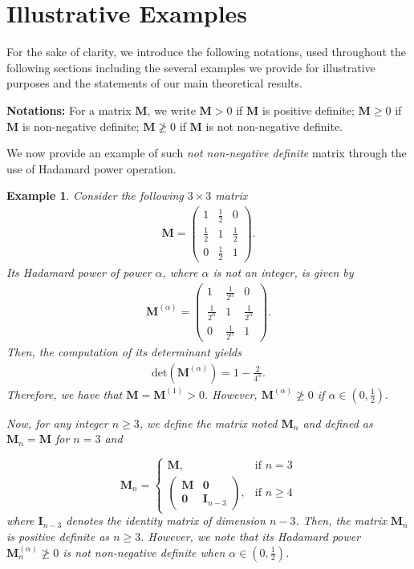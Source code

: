 \documentclass[conference,letterpaper]{IEEEtran}
\numberwithin{equation}{section}
\newcommand{\lbl}{\label}
\newcommand{\beaa}{\begin{eqnarray*}}
\newcommand{\eeaa}{\end{eqnarray*}}
\newtheorem{example}{{\sc Example}}[section]
\begin{document}
\section{Illustrative Examples}\lbl{sec:main}

For the sake of clarity, we introduce the following notations, used throughout the following sections including the several examples we provide for illustrative purposes and the statements of our main theoretical results.  

\medskip
\textbf{Notations: } For a matrix $\mathbf{M}$, we write $\mathbf{M}>0$ if $\mathbf{M}$ is positive definite; $\mathbf{M}\geq 0$ if $\mathbf{M}$ is non-negative definite; $\mathbf{M}\ngeqslant 0$ if $\mathbf{M}$ is not non-negative definite.

\medskip

We now provide an example of such \emph{not non-negative definite} matrix through the use of Hadamard power operation.
\medskip
\begin{example} Consider  the following $3\times 3$ matrix
\beaa
\mathbf{M}=
\begin{pmatrix}
1 & \frac{1}{2} & 0\\
\frac{1}{2} & 1 & \frac{1}{2}\\
0 & \frac{1}{2} & 1
\end{pmatrix}
.
\eeaa
Its Hadamard power of power $\alpha$, where $\alpha$ is not an integer, is given by
\beaa
\mathbf{M}^{(\alpha)}=
\begin{pmatrix}
1 & \frac{1}{2^{\alpha}} & 0\\
\frac{1}{2^{\alpha}} & 1 & \frac{1}{2^{\alpha}}\\
0 & \frac{1}{2^{\alpha}} & 1
\end{pmatrix}
.
\eeaa
 Then, the computation of its determinant yields
\beaa
\mbox{det}(\mathbf{M}^{(\alpha)})=1-\frac{2}{4^{\alpha}}.
\eeaa
Therefore, we have that $\mathbf{M}=\mathbf{M}^{(1)}>0$. 
However, $\mathbf{M}^{(\alpha)}\ngeqslant 0$ if $\alpha \in (0, \frac{1}{2}).$

Now, for any integer $n\geq 3$, we define the matrix noted $\mathbf{M}_n$ and defined as 
$\mathbf{M}_n=\mathbf{M}$ for $n=3$ and

\[
    \mathbf{M}_n= 
\begin{cases}
    \mathbf{M},& \text{if } n=3\\
    \begin{pmatrix}
\mathbf{M} & \mathbf{0}\\
\mathbf{0} & \mathbf{I}_{n-3}
\end{pmatrix},              & \text{if } n\geq 4
\end{cases}
\]
where $\mathbf{I}_{n-3}$ denotes the identity matrix of dimension $n-3$.
Then,  the matrix $\mathbf{M}_n$ is positive definite as $n\geq 3$. 
However, we note that its Hadamard power $\mathbf{M}_n^{(\alpha)}\ngeqslant 0$ is not non-negative definite when $\alpha \in (0, \frac{1}{2})$.
\end{example}
\end{document}
